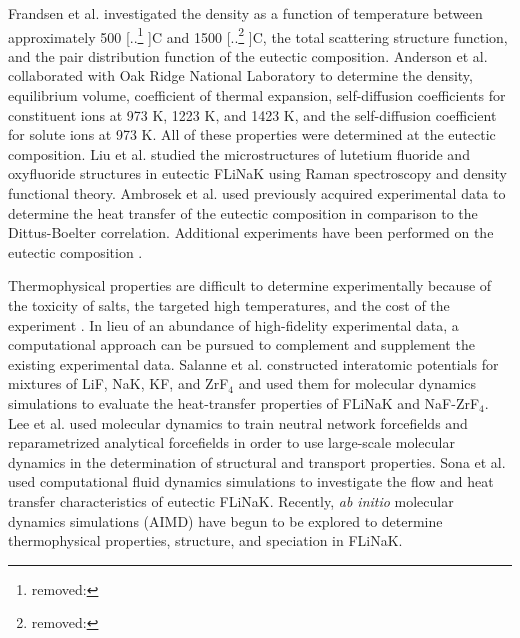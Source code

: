 \documentclass[preprint,12pt]{elsarticle}
\providecommand{\DIFdel}[1]{{\protect\color{red} [..\footnote{removed: #1} ]}} %
\providecommand{\DIFaddbegin}{} %
\providecommand{\DIFaddend}{} %
\providecommand{\DIFdelbegin}{} %
\providecommand{\DIFdelend}{} %
\newcommand{\DIFscaledelfig}{0.5}
\newlength{\DIFdelgraphicswidth} %
\newlength{\DIFdelgraphicsheight} %
\newcommand{\DIFaddincludegraphics}[2][]{{\color{blue}\fbox{\DIFOincludegraphics[#1]{#2}}}} %
\newcommand{\DIFdelincludegraphics}[2][]{%
\sbox{\DIFdelgraphicsbox}{\DIFOincludegraphics[#1]{#2}}%
\settoboxwidth{\DIFdelgraphicswidth}{\DIFdelgraphicsbox} %
\settoboxtotalheight{\DIFdelgraphicsheight}{\DIFdelgraphicsbox} %
\scalebox{\DIFscaledelfig}{%
\parbox[b]{\DIFdelgraphicswidth}{\usebox{\DIFdelgraphicsbox}\\[-\baselineskip] \rule{\DIFdelgraphicswidth}{0em}}\llap{\resizebox{\DIFdelgraphicswidth}{\DIFdelgraphicsheight}{%
\setlength{\unitlength}{\DIFdelgraphicswidth}%
\begin{picture}(1,1)%
\thicklines\linethickness{2pt} %
{\color[rgb]{1,0,0}\put(0,0){\framebox(1,1){}}}%
{\color[rgb]{1,0,0}\put(0,0){\line( 1,1){1}}}%
{\color[rgb]{1,0,0}\put(0,1){\line(1,-1){1}}}%
\end{picture}%
}\hspace*{3pt}}} %
} %
\DeclareRobustCommand{\DIFaddbegin}{\DIFOaddbegin \let\includegraphics\DIFaddincludegraphics} %
\DeclareRobustCommand{\DIFaddend}{\DIFOaddend \let\includegraphics\DIFOincludegraphics} %
\DeclareRobustCommand{\DIFdelbegin}{\DIFOdelbegin \let\includegraphics\DIFdelincludegraphics} %
\DeclareRobustCommand{\DIFdelend}{\DIFOaddend \let\includegraphics\DIFOincludegraphics} %
\begin{document}
Frandsen et al. investigated the density as a function of temperature between approximately 500\DIFdelbegin \DIFdel{\textdegree }\DIFdelend \DIFaddbegin \degree \DIFaddend C and 1500\DIFdelbegin \DIFdel{\textdegree }\DIFdelend \DIFaddbegin \degree \DIFaddend C, the total scattering structure function, and the pair distribution function of the eutectic composition\cite{Frandsen2020}. Anderson et al. collaborated with Oak Ridge National Laboratory to determine the density, equilibrium volume, coefficient of thermal expansion, self-diffusion coefficients for constituent ions at 973 K, 1223 K, and 1423 K, and the self-diffusion coefficient for solute ions at 973 K\cite{Anderson2015}. All of these properties were determined at the eutectic composition. Liu et al. studied the microstructures of lutetium fluoride and oxyfluoride structures in eutectic FLiNaK using Raman spectroscopy and density functional theory\cite{Xiyan2021}. Ambrosek et al. used previously acquired experimental data to determine the heat transfer of the eutectic composition in comparison to the Dittus-Boelter correlation\cite{Ambrosek2009}. Additional experiments have been performed on the eutectic composition \cite{Hoffman1955,Holcomb2010,Yoder2014}.

Thermophysical properties are difficult to determine experimentally because of the toxicity of salts, the targeted high temperatures, and the cost of the experiment \cite{Porter2022}. In lieu of an abundance of high-fidelity experimental data, a computational approach can be pursued to complement and supplement the existing experimental data. Salanne et al. constructed interatomic potentials for mixtures of LiF, NaK, KF, and ZrF$_4$ and used them for molecular dynamics simulations to evaluate the heat-transfer properties of FLiNaK and NaF-ZrF$_4$\cite{Salanne2009}. Lee et al. used molecular dynamics to train neutral network forcefields and reparametrized analytical forcefields in order to use large-scale molecular dynamics in the determination of structural and transport properties\cite{Lee2021}. Sona et al. used computational fluid dynamics simulations to investigate the flow and heat transfer characteristics of eutectic FLiNaK\cite{Sona2014}. Recently, \textit{ab initio} molecular dynamics simulations (AIMD) have begun to be explored to determine thermophysical properties, structure, and speciation in FLiNaK\cite{Nam2014,Frandsen2020,Clark2020,Sprouster2022}. 
\end{document}
